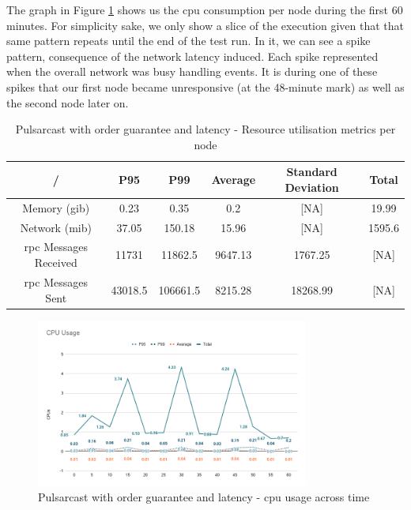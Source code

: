 The graph in Figure \ref{fig:graph-pulsarcast-order-latency-cpu} shows us the
\acrshort{cpu} consumption per node during the first 60 minutes. For simplicity
sake, we only show a slice of the execution given that that same pattern
repeats until the end of the test run. In it, we can see a spike pattern,
consequence of the network latency induced. Each spike represented when the
overall network was busy handling events. It is during one of these spikes that
our first node became unresponsive (at the 48-minute mark) as well as the
second node later on.

\begin{table}[!htb]
\caption{Pulsarcast with order guarantee and latency - Resource utilisation metrics per node}
\label{table:pulsarcast-order-latency}
  \begin{center}
   \begin{tabular}{|c| c c c c c|} 
   \hline
   / & P95 & P99 & Average & Standard Deviation & Total \\ [0.5ex] 
   \hline\hline
   Memory (\acrshort{gib}) & 0.23 & 0.35 & 0.2 & [NA] & 19.99 \\
   \hline
   Network (\acrshort{mib}) & 37.05 & 150.18 & 15.96 & [NA] & 1595.6 \\
   \hline
   \acrshort{rpc} Messages Received & 11731 & 11862.5 & 9647.13 & 1767.25 & [NA] \\
   \hline
   \acrshort{rpc} Messages Sent & 43018.5 & 106661.5 & 8215.28 & 18268.99 & [NA] \\ [1ex] 
   \hline
  \end{tabular}
  \end{center}
\end{table}

\begin{figure}[!htb]
  \centering
  \includegraphics[width=0.8\textwidth]{img/graph-pulsarcast-order-latency-cpu.png}
  \caption{Pulsarcast with order guarantee and latency - \acrshort{cpu} usage across time}
  \label{fig:graph-pulsarcast-order-latency-cpu}
\end{figure}


